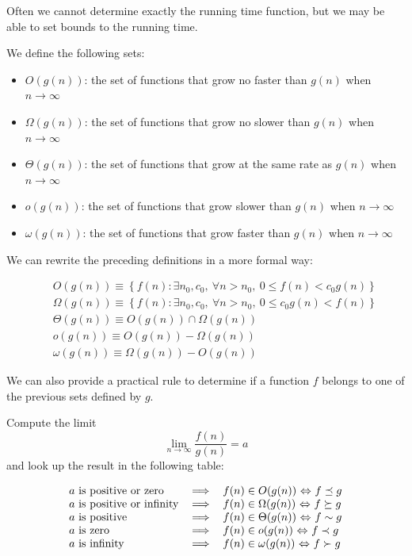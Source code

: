 \documentclass[justified, sixbynine]{tufte-book}
\theoremstyle{plain}%
\newtheorem * {corollary}{Corollary}
\theoremstyle{definition}
\theoremstyle{remark}
\newtheorem * {remark}{Remark}
\newtheorem * {note}{Note}
\begin{document}
\begin{fullwidth}
Often we cannot determine exactly the running time function, but we may be able to set bounds to the running time.

We define the following sets:

\begin{itemize}
\item  $O(g(n))$: the set of functions that grow no faster than $g(n)$ when $%
n\rightarrow \infty $

\item  $\Omega (g(n))$: the set of functions that grow no slower than $g(n)$ when $%
n\rightarrow \infty $

\item  $\Theta (g(n))$: the set of functions that grow at the same rate as $g(n)$ when $%
n\rightarrow \infty $

\item  $o(g(n))$: the set of functions that grow slower than $g(n)$ when $n\rightarrow
\infty $

\item  $\omega (g(n))$: the set of functions that grow faster than $g(n)$ when $n\rightarrow \infty $
\end{itemize}

We can rewrite the preceding definitions in a more formal way:

\begin{eqnarray}
&&O(g(n))\equiv \left\{ f(n):\exists n_0, c_0, \ \forall n>n_0, \
0\leq f(n)<c_0g(n)\right\} \\
&&\Omega (g(n))\equiv \left\{ f(n):\exists n_0, c_0, \ \forall
n>n_0, \ 0\leq c_0g(n)<f(n)\right\} \\
&&\Theta (g(n))\equiv O(g(n))\cap \Omega (g(n)) \\
&&o(g(n))\equiv O(g(n))-\Omega (g(n)) \\
&&\omega (g(n))\equiv \Omega (g(n))-O(g(n))
\end{eqnarray}

We can also provide a practical rule to determine if a function $f$ belongs to one of the previous sets defined by $g$.

Compute the limit
\begin{equation}
\lim_{n\rightarrow \infty }\frac{f(n)}{g(n)}=a
\end{equation}
and look up the result in the following table:

\begin{equation}
\begin{tabular}{lll}
$a$ is positive or zero & $\Longrightarrow $ & $f(n)\in O(g(n))$ $%
\Leftrightarrow $ $f\preceq g$ \\
$a$ is positive or infinity & $\Longrightarrow $ & $f(n)\in \Omega (g(n))$ $%
\Leftrightarrow $ $f\succeq g$ \\
$a$ is positive & $\Longrightarrow $ & $f(n)\in \Theta (g(n))$ $%
\Leftrightarrow $ $f\sim g$ \\
$a$ is zero & $\Longrightarrow $ & $f(n)\in o(g(n))$ $\Leftrightarrow $ $%
f\prec g$ \\
$a$ is infinity & $\Longrightarrow $ & $f(n)\in \omega (g(n))$ $%
\Leftrightarrow $ $f\succ g$%
\end{tabular}
\end{equation}


\end{fullwidth}
\end{document}
